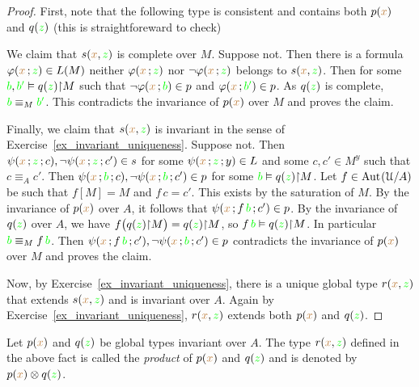 \begin{proof}
  First, note that the following type is consistent and contains both $p({\color{brown} x})$ and $q({\color{green} z})$  (this is straightforeward to check)


  We claim that $s({\color{brown} x},{\color{green} z})$ is complete over $M$.
  Suppose not. Then there is a formula $\varphi({\color{brown} x}\,;{\color{green} z})\in L(M)$ neither $\varphi({\color{brown} x}\,;{\color{green} z})$ nor $\neg\varphi({\color{brown} x}\,;{\color{green} z})$ belongs to $s({\color{brown} x},{\color{green} z})$.
  Then for some ${\color{green} b},{\color{green} b'}\vDash q({\color{green} z}){\restriction} M$ such that $\neg\varphi({\color{brown} x}\,;{\color{green} b})\in p$ and $\varphi({\color{brown} x}\,;{\color{green} b'})\in p$.
  As $q({\color{green} z})$ is complete, ${\color{green} b}\equiv_M{\color{green} b'}$.
  This contradicts the invariance of $p({\color{brown} x})$ over $M$ and proves the claim.

  Finally, we claim that $s({\color{brown} x},{\color{green} z})$ is invariant in the sense of Exercise~\ref{ex_invariant_uniqueness}.
  Suppose not.
  Then $\psi({\color{brown} x}\,;{\color{green} z}\,;c),\neg\psi({\color{brown} x}\,;{\color{green} z}\,;c')\in s$ for some $\psi({\color{brown} x}\,;{\color{green} z}\,;y)\in L$ and some $c,c'\in M^y$ such that $c\equiv_A c'$.
  Then  $\psi({\color{brown} x}\,;{\color{green} b}\,;c),\neg\psi({\color{brown} x}\,;{\color{green} b}\,;c')\in p$ for some ${\color{green} b}\vDash q({\color{green} z}){\restriction} M$.
  Let $f\in{\rm Aut\kern.15ex}(\EuScript U/A)$ be such that $f[M]=M$ and $f\,c=c'$.
  This exists by the saturation of $M$.
  By the invariance of $p({\color{brown} x})$ over $A$, it follows that $\psi({\color{brown} x}\,;f\,{\color{green} b}\,;c')\in p$.
  By the invariance of $q({\color{green} z})$ over $A$, we have $f\big(q({\color{green} z}){\restriction} M\big)=q({\color{green} z}){\restriction} M$, so $f\,{\color{green} b}\vDash q({\color{green} z}){\restriction} M$.
  In particular ${\color{green} b}\equiv_M f\,{\color{green} b}$.
  Then $\psi({\color{brown} x}\,;f\,{\color{green} b}\,;c'),\neg\psi({\color{brown} x}\,;{\color{green} b}\,;c')\in p$ contradicts the invariance of $p({\color{brown} x})$ over $M$ and proves the claim.

  Now, by Exercise~\ref{ex_invariant_uniqueness}, there is a unique global type $r({\color{brown} x},{\color{green} z})$ that extends $s({\color{brown} x},{\color{green} z})$ and is invariant over $A$.
  Again by Exercise~\ref{ex_invariant_uniqueness}, $r({\color{brown} x},{\color{green} z})$ extends both $p({\color{brown} x})$ and $q({\color{green} z})$.
\end{proof}

\begin{definition}\label{def_tensor_product}
  Let $p({\color{brown} x})$ and $q({\color{green} z})$ be global types invariant over $A$. 
  The type $r({\color{brown} x},{\color{green} z})$ defined in the above fact is called the \emph{product\/} of $p({\color{brown} x})$ and $q({\color{green} z})$ and is denoted by $p({\color{brown} x})\otimes q({\color{green} z})$.
\end{definition}

